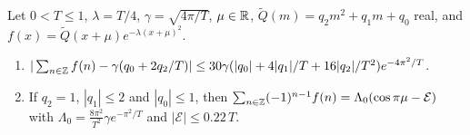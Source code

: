 \begin{lemma}\label{lem:poisson}
Let $0<T\le1$, $\lambda=T/4$, $\gamma=\sqrt{4\pi/T}$, $\mu\in\mathbb{R}$, $\widetilde
Q(m)=q_2m^2+q_1m+q_0$ real, and $f(x)=\widetilde Q(x+\mu)e^{-\lambda(x+\mu)^2}$.
\begin{enumerate}[label=\textup{(\roman*)},leftmargin=*]
\item $|\sum_{n\in\mathbb{Z}}f(n)-\gamma(q_0+2q_2/T)|\le30\gamma(|q_0|+4|q_1|/T+16|q_2|/
T^2)e^{-4\pi^2/T}$.
\item If $q_2=1$, $|q_1|\le2$ and $|q_0|\le1$, then $\sum_{n\in\mathbb{Z}}(-1)^{n-1}f(n)
=\Lambda_0(\cos\pi\mu-\mathcal E)$ with $\Lambda_0=\frac{8\pi^2}{T^2}\gamma
e^{-\pi^2/T}$ and $|\mathcal E|\le0.22\,T$.
\end{enumerate}
\end{lemma}

